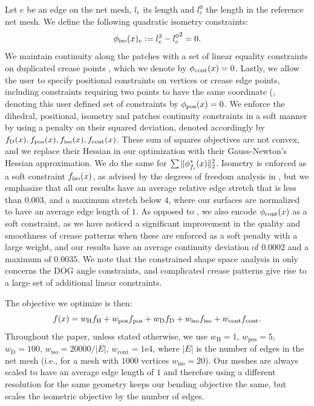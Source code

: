 Let $e$ be an edge on the net mesh, $l_e$ its length and $l_e^0$ the length in the reference net mesh. We define the following quadratic isometry constraints:
\begin{equation}
\phi_\text{iso}(x)_e := l_e^2 - {l_e^0}^2 = 0.
\end{equation}
We maintain continuity along the patches with a set of linear equality constraints on duplicated crease points \cite{rabi2018shape}, which we denote by $\phi_\text{cont}(x) = 0$. Lastly, we allow the user to specify positional constraints on vertices or crease edge points, including constraints requiring two points to have the same coordinate (, denoting this user defined set of constraints by $\phi_{\text{pos}}(x) = 0$.
We enforce the dihedral, positional, isometry and patches continuity constraints in a soft manner by using a penalty on their squared deviation, denoted accordingly by $f_\text{D}(x), f_\text{pos}(x), f_\text{iso}(x), f_\text{cont}(x)$. These sum of squares objectives are not convex, and we replace their Hessian in our optimization with their Gauss-Newton's Hessian approximation. We do the same for $\sum \|\phi^*_{f_i}(x)\|_2^2$. Isometry is enforced as a soft constraint $f_\text{iso}(x)$, as advised by the degrees of freedom analysis in \cite{rabi18,rabi2018shape}, but we emphasize that all our results have an average relative edge stretch that is less than $0.003$, and a maximum stretch below $4$, where our surfaces are normalized to have an average edge length of $1$. As opposed to \cite{rabi2018shape}, we also encode  $\phi_\text{cont}(x)$  as a soft constraint, as we have noticed a significant improvement in the quality and smoothness of crease patterns when these are enforced as a soft penalty with a large weight,
and our results have an average continuity deviation of $0.0002$ and a maximum of $0.0035$. We note that the constrained shape space analysis in \cite{rabi2018shape} only concerns the DOG angle constraints, and complicated crease patterns give rise to a large set of additional linear constraints.
 
The objective we optimize is then:
\begin{equation} \label{eq:opt}
f(x) = w_\text{H}f_\text{H}+w_\text{pos}f_\text{pos}+w_\text{D}f_\text{D}+w_\text{iso}f_\text{iso}+w_\text{cont}f_\text{cont}.
\end{equation}
Throughout the paper, unless stated otherwise, we use $w_\text{H} = 1$, $w_\text{pos}=5$, $w_\text{D} = 100$, $w_\text{iso}= {20000}/{|E|}$, $w_\text{cont} = \text{1e4}$, where $|E|$ is the number of edges in the net mesh (i.e., for a mesh with $1000$ vertices $w_\text{iso}=20$). Our meshes are always scaled to have an average edge length of $1$ and therefore using a different resolution for the same geometry keeps our bending objective the same, but scales the isometric objective by the number of edges.